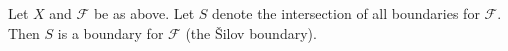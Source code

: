 
Let $X$ and $\mathcal{F}$ be as above. Let $S$ denote the intersection of all boundaries for $\mathcal{F}$. Then $S$ is a boundary for $\mathcal{F}$ (the Šilov boundary).
